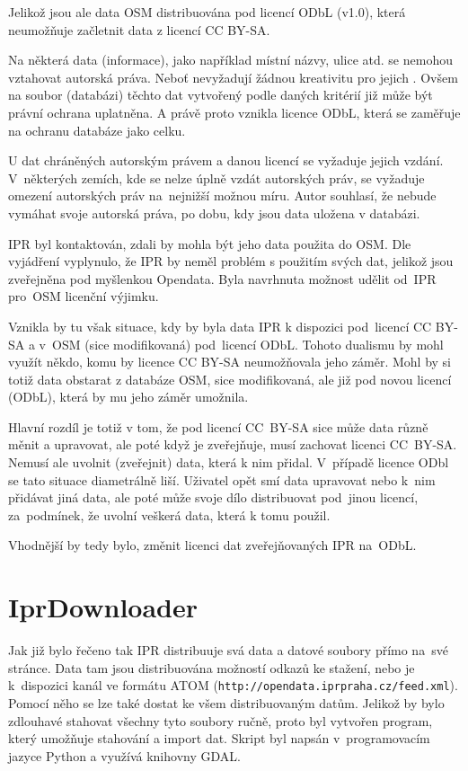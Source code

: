 Jelikož jsou ale data OSM distribuována pod licencí ODbL (v1.0), která
neumožňuje začletnit data z licencí CC BY-SA. 

Na některá data (informace), jako například místní názvy, ulice atd.
se nemohou vztahovat autorská práva. Neboť nevyžadují žádnou 
kreativitu pro jejich . Ovšem na soubor (databázi) těchto dat
vytvořený podle daných kritérií již může být právní
ochrana uplatněna. A právě proto vznikla licence ODbL, která se
zaměřuje na ochranu databáze jako celku.

U dat chráněných autorským právem a danou licencí se vyžaduje jejich
vzdání. V~některých zemích, kde se nelze úplně vzdát autorských
práv, se vyžaduje omezení autorských práv na~nejnižší možnou
míru. Autor souhlasí, že nebude vymáhat svoje autorská práva, po dobu,
kdy jsou data uložena v databázi. \cite{ODbl}

IPR byl kontaktován, zdali by mohla být jeho data použita do OSM.
Dle vyjádření vyplynulo, že IPR by neměl problém s použitím svých dat,
jelikož jsou zveřejněna pod myšlenkou Opendata. Byla navrhnuta
možnost udělit od~IPR pro~OSM licenční výjimku.

Vznikla by tu však situace, kdy by byla data IPR k dispozici 
pod~licencí CC BY-SA a v~OSM (sice modifikovaná) pod~licencí
ODbL. Tohoto dualismu by mohl využít někdo, komu by licence CC BY-SA
neumožňovala jeho záměr. Mohl by si totiž data obstarat z databáze OSM,
sice modifikovaná, ale již pod novou licencí (ODbL), která by mu jeho
záměr umožnila.

Hlavní rozdíl je totiž v tom, že pod licencí CC~BY-SA sice může data
různě měnit a upravovat, ale poté když je zveřejňuje, musí zachovat
licenci CC~BY-SA. Nemusí ale uvolnit (zveřejnit) data, která k nim 
přidal. V~případě licence ODbl se tato situace diametrálně liší.
Uživatel opět smí data upravovat nebo k~nim přidávat jiná data, ale
poté může svoje dílo distribuovat pod~jinou licencí, za~podmínek, že
uvolní veškerá data, která k tomu použil.

Vhodnější by tedy bylo, změnit licenci dat zveřejňovaných IPR
na~ODbL.



\section{IprDownloader}
\label{IprDownloader}
Jak již bylo řečeno tak IPR distribuuje svá data a datové soubory přímo
na~své stránce. Data tam jsou distribuována možností odkazů ke stažení,
nebo je k~dispozici kanál ve formátu ATOM ({\tt http://opendata.iprpraha.cz/feed.xml}).
Pomocí něho se lze také dostat ke všem distribuovaným datům. Jelikož
by bylo zdlouhavé stahovat všechny tyto soubory ručně, proto byl
vytvořen program, který umožňuje stahování a import dat. Skript byl
napsán v~programovacím jazyce Python a využívá knihovny GDAL.

